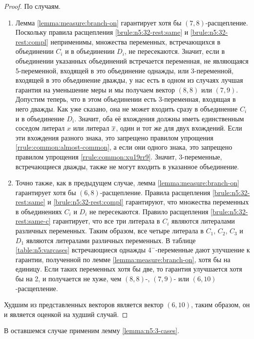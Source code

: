 \begin{proof}
 По случаям.
 \begin{enumerate}
  \item Лемма \ref{lemma:measure:branch-on} гарантирует хотя бы $(7,8)$-расщепление.
  Поскольку правила расщепления \ref{brule:n5:32-rest:same} и \ref{brule:n5:32-rest:compl} неприменимы, множества переменных, встречающихся в объединении $C_i$ и в объединении $D_i$, не пересекаются.
  Значит, если в объединении указанных объединений встречается переменная, не являющаяся 5-переменной, входящей в это объединение однажды, или 3-переменной, входящей в это объединение дважды, у нас есть в одном из случаях лучшая гарантия на уменьшение меры и мы получаем вектор $(8,8)$ или $(7,9)$.
  Допустим теперь, что в этом объединении есть 3-переменная, входящая в него дважды.
  Как уже сказано, она не может входить сразу в объединение $C_i$ и в объединение $D_i$.
  Значит, оба её вхождения должны иметь единственным соседом литерал $x$ или литерал $\overline{x}$, один и тот же для двух вхождений.
  Если эти вхождения разного знака, это запрещено правилом упрощения \ref{rrule:common:almost-common}, а если они одного знака, это запрещено правилом упрощения \ref{rrule:common:xu19rr9}.
  Значит, 3-переменные, встречающиеся дважды, также не могут входить в указанное объединение.

  \item Точно также, как в предыдущем случае, лемма \ref{lemma:measure:branch-on} гарантирует хотя бы $(6,8)$-расщепление.
   Правила расщепления \ref{brule:n5:32-rest:same} и \ref{brule:n5:32-rest:compl} гарантируют, что множества переменных в объединениях $C_i$ и $D_i$ не пересекаются.
   Правило расщепления \ref{brule:n5:32-rest:same-c} гарантирует, что все три литерала в $C_i$ являются литералами различных переменных.
   Таким образом, все четыре литерала в $C_1$, $C_2$, $C_3$ и $D_1$ являются литералами различных переменных.
   В таблице \ref{table:n5:varcases} встречающиеся однажды $4^-$-переменные дают улучшение к гарантии, полученной по лемме \ref{lemma:measure:branch-on}, хотя бы на единицу. Если таких переменных хотя бы две, то гарантия улучшается хотя бы на 2, и получается не хуже, чем $(8,8)$-, $(7,9)$- или $(6,10)$-расщепление.
 \end{enumerate}

 Худшим из представленных векторов является вектор $(6,10)$, таким образом, он и является оценкой на худший случай.
\end{proof}

В оставшемся случае применим лемму \ref{lemma:n5:3-cases}.


